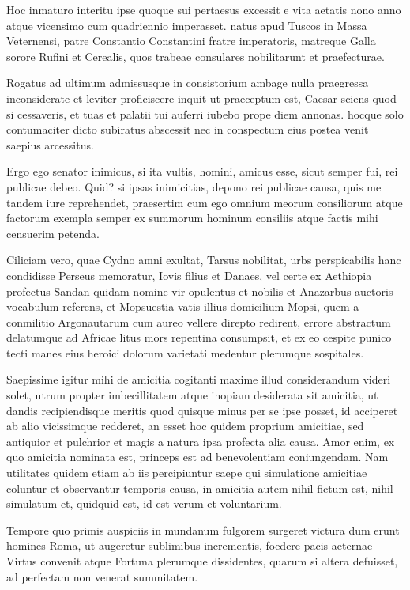 \documentclass{inf2164}
\begin{document}
Hoc inmaturo interitu ipse quoque sui pertaesus excessit e vita aetatis nono anno atque vicensimo cum quadriennio imperasset. natus apud Tuscos in Massa Veternensi, patre Constantio Constantini fratre imperatoris, matreque Galla sorore Rufini et Cerealis, quos trabeae consulares nobilitarunt et praefecturae.

Rogatus ad ultimum admissusque in consistorium ambage nulla praegressa inconsiderate et leviter proficiscere inquit ut praeceptum est, Caesar sciens quod si cessaveris, et tuas et palatii tui auferri iubebo prope diem annonas. hocque solo contumaciter dicto subiratus abscessit nec in conspectum eius postea venit saepius arcessitus.

Ergo ego senator inimicus, si ita vultis, homini, amicus esse, sicut semper fui, rei publicae debeo. Quid? si ipsas inimicitias, depono rei publicae causa, quis me tandem iure reprehendet, praesertim cum ego omnium meorum consiliorum atque factorum exempla semper ex summorum hominum consiliis atque factis mihi censuerim petenda.

Ciliciam vero, quae Cydno amni exultat, Tarsus nobilitat, urbs perspicabilis hanc condidisse Perseus memoratur, Iovis filius et Danaes, vel certe ex Aethiopia profectus Sandan quidam nomine vir opulentus et nobilis et Anazarbus auctoris vocabulum referens, et Mopsuestia vatis illius domicilium Mopsi, quem a conmilitio Argonautarum cum aureo vellere direpto redirent, errore abstractum delatumque ad Africae litus mors repentina consumpsit, et ex eo cespite punico tecti manes eius heroici dolorum varietati medentur plerumque sospitales.

Saepissime igitur mihi de amicitia cogitanti maxime illud considerandum videri solet, utrum propter imbecillitatem atque inopiam desiderata sit amicitia, ut dandis recipiendisque meritis quod quisque minus per se ipse posset, id acciperet ab alio vicissimque redderet, an esset hoc quidem proprium amicitiae, sed antiquior et pulchrior et magis a natura ipsa profecta alia causa. Amor enim, ex quo amicitia nominata est, princeps est ad benevolentiam coniungendam. Nam utilitates quidem etiam ab iis percipiuntur saepe qui simulatione amicitiae coluntur et observantur temporis causa, in amicitia autem nihil fictum est, nihil simulatum et, quidquid est, id est verum et voluntarium.

Tempore quo primis auspiciis in mundanum fulgorem surgeret victura dum erunt homines Roma, ut augeretur sublimibus incrementis, foedere pacis aeternae Virtus convenit atque Fortuna plerumque dissidentes, quarum si altera defuisset, ad perfectam non venerat summitatem.
\end{document}
